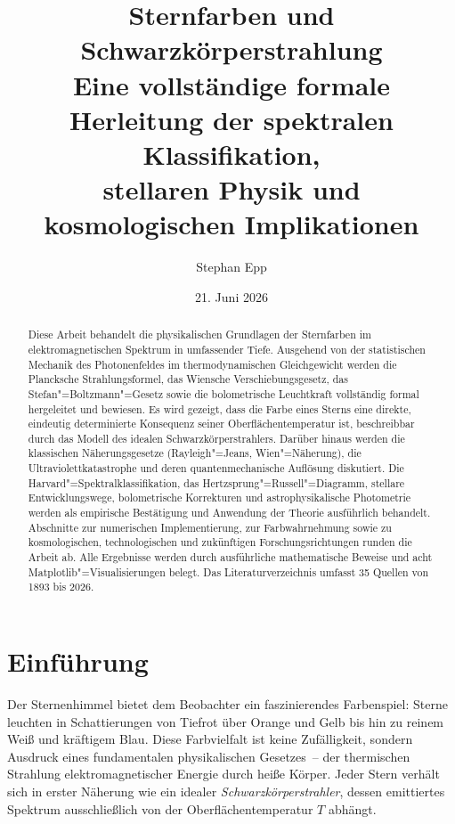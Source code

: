 ﻿\documentclass[a4paper,12pt]{article}
\title{\textbf{Sternfarben und Schwarzkörperstrahlung}\\[0.5em]
\large Eine vollständige formale Herleitung der spektralen Klassifikation,\\
stellaren Physik und kosmologischen Implikationen}
\author{Stephan Epp}
\date{21. Juni 2026}
\theoremstyle{definition}
\begin{document}
\maketitle

\begin{abstract}
Diese Arbeit behandelt die physikalischen Grundlagen der Sternfarben im elektromagnetischen
Spektrum in umfassender Tiefe. Ausgehend von der statistischen Mechanik des Photonenfeldes
im thermodynamischen Gleichgewicht werden die Plancksche Strahlungsformel, das Wiensche
Verschiebungsgesetz, das Stefan"=Boltzmann"=Gesetz sowie die bolometrische Leuchtkraft
vollständig formal hergeleitet und bewiesen. Es wird gezeigt, dass die Farbe eines Sterns
eine direkte, eindeutig determinierte Konsequenz seiner Oberflächentemperatur ist,
beschreibbar durch das Modell des idealen Schwarzkörperstrahlers. Darüber hinaus werden
die klassischen Näherungsgesetze (Rayleigh"=Jeans, Wien"=Näherung), die Ultraviolettkatastrophe
und deren quantenmechanische Auflösung diskutiert. Die Harvard"=Spektralklassifikation,
das Hertzsprung"=Russell"=Diagramm, stellare Entwicklungswege, bolometrische Korrekturen
und astrophysikalische Photometrie werden als empirische Bestätigung und Anwendung der
Theorie ausführlich behandelt. Abschnitte zur numerischen Implementierung,
zur Farbwahrnehmung sowie zu kosmologischen, technologischen und zukünftigen
Forschungsrichtungen runden die Arbeit ab. Alle Ergebnisse werden durch ausführliche
mathematische Beweise und acht Matplotlib"=Visualisierungen belegt. Das Literaturverzeichnis
umfasst 35 Quellen von 1893 bis 2026.
\end{abstract}

\tableofcontents
\newpage

\section{Einführung}

Der Sternenhimmel bietet dem Beobachter ein faszinierendes Farbenspiel: Sterne leuchten in
Schattierungen von Tiefrot über Orange und Gelb bis hin zu reinem Weiß und kräftigem Blau.
Diese Farbvielfalt ist keine Zufälligkeit, sondern Ausdruck eines fundamentalen physikalischen
Gesetzes~-- der thermischen Strahlung elektromagnetischer Energie durch heiße Körper.
Jeder Stern verhält sich in erster Näherung wie ein idealer \emph{Schwarzkörperstrahler},
dessen emittiertes Spektrum ausschließlich von der Oberflächentemperatur $T$ abhängt.
\end{document}
